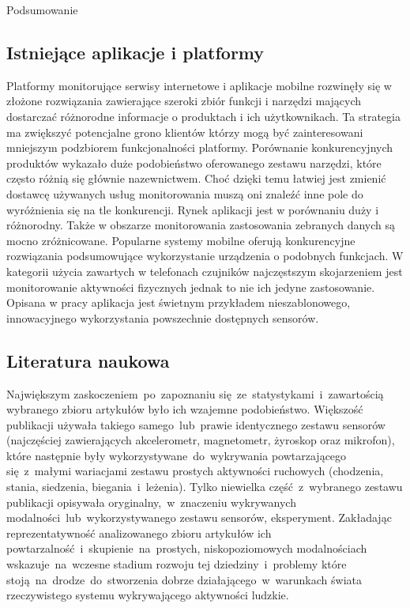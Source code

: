 \begin{chapter}{Podsumowanie}
	\subsection{Istniejące aplikacje i platformy}
	Platformy monitorujące serwisy internetowe i aplikacje mobilne rozwinęły się w złożone rozwiązania zawierające szeroki zbiór funkcji i narzędzi mających dostarczać różnorodne informacje o produktach i ich użytkownikach. Ta strategia ma zwiększyć potencjalne grono klientów którzy mogą być zainteresowani mniejszym podzbiorem funkcjonalności platformy. Porównanie konkurencyjnych produktów wykazało duże podobieństwo oferowanego zestawu narzędzi, które często różnią się głównie nazewnictwem. Choć dzięki temu łatwiej jest zmienić dostawcę używanych usług monitorowania muszą oni znaleźć inne pole do wyróżnienia się na tle konkurencji. Rynek aplikacji jest w porównaniu duży i różnorodny. Także w obszarze monitorowania zastosowania zebranych danych są mocno zróżnicowane. Popularne systemy mobilne oferują konkurencyjne rozwiązania podsumowujące wykorzystanie urządzenia o podobnych funkcjach. W kategorii użycia zawartych w telefonach czujników najczęstszym skojarzeniem jest monitorowanie aktywności fizycznych jednak to nie ich jedyne zastosowanie. Opisana w pracy aplikacja  jest świetnym przykładem nieszablonowego, innowacyjnego wykorzystania powszechnie dostępnych sensorów.
	
	\subsection{Literatura naukowa}
	Największym zaskoczeniem~po~zapoznaniu się~ze~statystykami~i~zawartością wybranego zbioru artykułów było ich wzajemne podobieństwo. Większość publikacji używała takiego samego~lub~prawie identycznego zestawu sensorów (najczęściej zawierających akcelerometr, magnetometr, żyroskop oraz mikrofon), które następnie były wykorzystywane~do~wykrywania powtarzającego się~z~małymi wariacjami zestawu prostych aktywności ruchowych (chodzenia, stania, siedzenia, biegania~i~leżenia). Tylko niewielka część~z~wybranego zestawu publikacji opisywała oryginalny,~w~znaczeniu wykrywanych modalności~lub~wykorzystywanego zestawu sensorów, eksperyment. Zakładając reprezentatywność analizowanego zbioru artykułów ich powtarzalność~i~skupienie~na~prostych, niskopoziomowych modalnościach wskazuje~na~wczesne stadium rozwoju tej dziedziny~i~problemy które stoją~na~drodze~do~stworzenia dobrze działającego~w~warunkach świata rzeczywistego systemu wykrywającego aktywności ludzkie.
	

\end{chapter}
